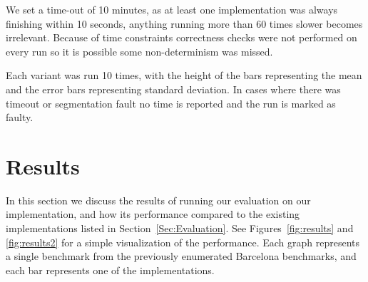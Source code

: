 \documentclass[sigconf]{acmart}
\begin{document}
We set a time-out of 10 minutes, as at least one implementation was always
finishing within 10 seconds, anything running more than 60 times slower becomes
irrelevant.  Because of time constraints correctness checks were not performed on
every run so it is possible some non-determinism was missed.

Each variant was run 10 times, with the height of the bars representing the
mean and the error bars representing standard deviation. In cases where there
was timeout or segmentation fault no time is reported and the run is marked
as faulty.

\section{Results} \label{Sec:Results}

In this section we discuss the results of running our evaluation on our
implementation, and how its performance compared to the existing
implementations listed in Section~\ref{Sec:Evaluation}. See
Figures~\ref{fig:results} and \ref{fig:results2} for a simple visualization of
the performance. Each graph represents a single benchmark from the previously
enumerated Barcelona benchmarks, and each bar represents one of the
implementations.
\end{document}

